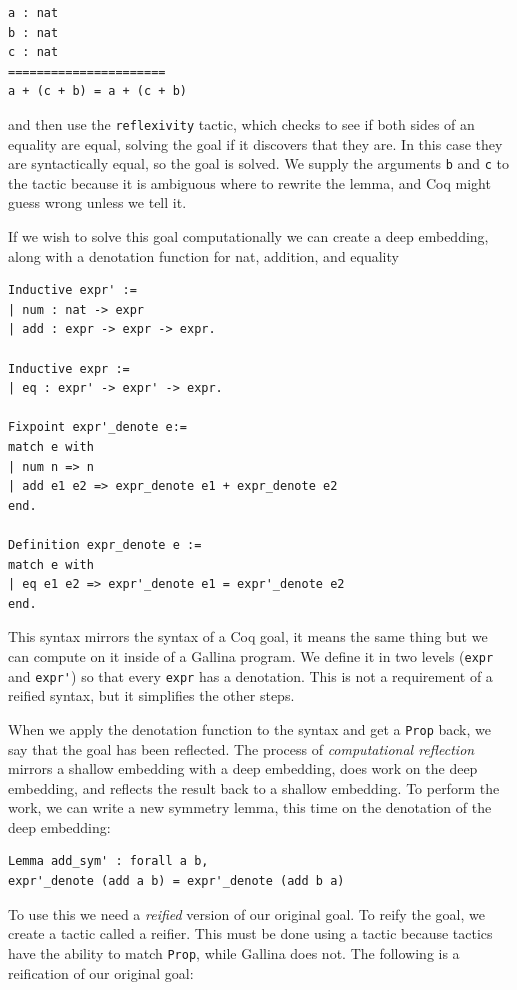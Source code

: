 \documentclass{puthesis}
\begin{document}
\begin{lstlisting}
a : nat
b : nat
c : nat
======================
a + (c + b) = a + (c + b) 
\end{lstlisting}

\noindent and then use the \lstinline|reflexivity| tactic, which
checks to see if both sides of an equality are equal, solving the goal
if it discovers that they are. In this case they are syntactically
equal, so the goal is solved. We supply the arguments \lstinline|b|
and \lstinline|c| to the tactic because it is ambiguous where to
rewrite the lemma, and Coq might guess wrong unless we tell it.

If we wish to solve this goal computationally we can create a deep
embedding, along with a denotation function for nat, addition, and
equality

\begin{lstlisting}
Inductive expr' :=
| num : nat -> expr
| add : expr -> expr -> expr.

Inductive expr :=
| eq : expr' -> expr' -> expr.

Fixpoint expr'_denote e:=
match e with
| num n => n
| add e1 e2 => expr_denote e1 + expr_denote e2
end.

Definition expr_denote e :=
match e with
| eq e1 e2 => expr'_denote e1 = expr'_denote e2
end.
\end{lstlisting} 

This syntax mirrors the syntax of a Coq goal, it means the same thing
but we can compute on it inside of a Gallina program. We define it in
two levels (\lstinline|expr| and \lstinline|expr'|) so that every
\lstinline|expr| has a denotation. This is not a requirement of a
reified syntax, but it simplifies the other steps.

When we apply
the denotation function to the syntax and get a \lstinline|Prop| back,
we say that the goal has been reflected. The process of
\emph{computational reflection} mirrors a shallow embedding with a
deep embedding, does work on the deep embedding, and reflects the
result back to a shallow embedding. To perform the work, we can write a
new symmetry lemma, this time on the denotation of the deep embedding:

\begin{lstlisting}
Lemma add_sym' : forall a b, 
expr'_denote (add a b) = expr'_denote (add b a)
\end{lstlisting}

To use this we need a \emph{reified} version of our original goal. To
reify the goal, we create a tactic called a reifier. This must be done
using a tactic because tactics have the ability to match
\lstinline|Prop|, while Gallina does not. The following is a
reification of our original goal:
\end{document}
